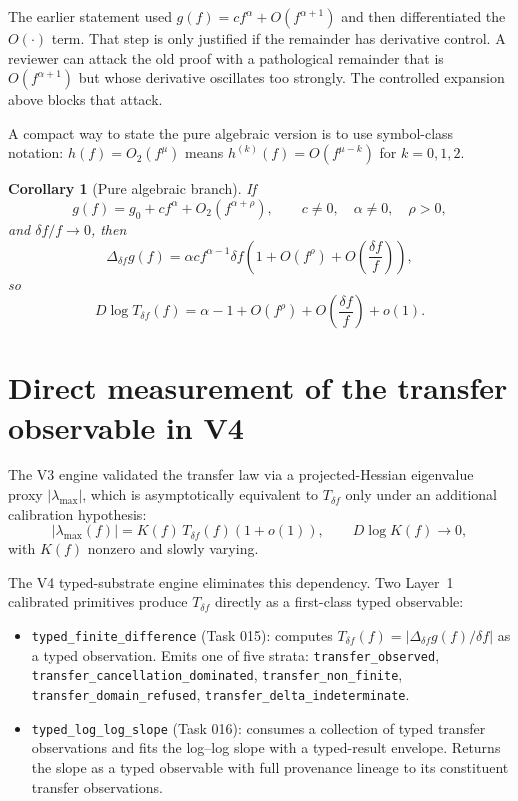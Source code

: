 \documentclass[11pt,a4paper]{article}
\newtheorem{corollary}[theorem]{Corollary}
\begin{document}
The earlier statement used $g(f)=c f^\alpha+O(f^{\alpha+1})$ and then differentiated the $O(\cdot)$ term. That step is only justified if the remainder has derivative control. A reviewer can attack the old proof with a pathological remainder that is $O(f^{\alpha+1})$ but whose derivative oscillates too strongly. The controlled expansion above blocks that attack.

A compact way to state the pure algebraic version is to use symbol-class notation: $h(f)=O_2(f^\mu)$ means $h^{(k)}(f)=O(f^{\mu-k})$ for $k=0,1,2$.

\begin{corollary}[Pure algebraic branch]\label{cor:pure-algebraic}
If
\[
    g(f)=g_0+c f^\alpha+O_2(f^{\alpha+\rho}),
    \qquad c\ne0,
    \quad \alpha\ne0,
    \quad \rho>0,
\]
and $\delta f/f\to0$, then
\begin{equation}\label{eq:pure-transfer}
    \Delta_{\delta f}g(f)
    =\alpha c f^{\alpha-1}\delta f
    \left(1+O(f^\rho)+O\left(\frac{\delta f}{f}\right)\right),
\end{equation}
so
\begin{equation}\label{eq:pure-slope}
    D\log T_{\delta f}(f)=\alpha-1+O(f^\rho)+O\left(\frac{\delta f}{f}\right)+o(1).
\end{equation}
\end{corollary}

\section{Direct measurement of the transfer observable in V4}\label{sec:v4-direct}

The V3 engine validated the transfer law via a projected-Hessian eigenvalue proxy $|\lambda_{\max}|$, which is asymptotically equivalent to $T_{\delta f}$ only under an additional calibration hypothesis:
\begin{equation}\label{eq:observable-equivalence}
    |\lambda_{\max}(f)|=K(f)\,T_{\delta f}(f)(1+o(1)),
    \qquad D\log K(f)\to0,
\end{equation}
with $K(f)$ nonzero and slowly varying.

The V4 typed-substrate engine eliminates this dependency. Two Layer~1 calibrated primitives produce $T_{\delta f}$ directly as a first-class typed observable:

\begin{itemize}
    \item \texttt{typed\_finite\_difference} (Task 015): computes $T_{\delta f}(f)=|\Delta_{\delta f}g(f)/\delta f|$ as a typed observation. Emits one of five strata: \texttt{transfer\_observed}, \texttt{transfer\_cancellation\_dominated}, \texttt{transfer\_non\_finite}, \texttt{transfer\_domain\_refused}, \texttt{transfer\_delta\_indeterminate}.
    \item \texttt{typed\_log\_log\_slope} (Task 016): consumes a collection of typed transfer observations and fits the log--log slope with a typed-result envelope. Returns the slope as a typed observable with full provenance lineage to its constituent transfer observations.
\end{itemize}
\end{document}
